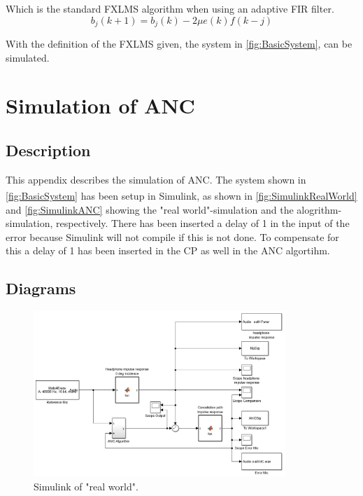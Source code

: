 Which is the standard FXLMS algorithm when using an adaptive FIR filter.
\begin{equation}\label{eq:FXLMSw_j(k+1)}
b_j(k+1) = b_j(k) - 2\mu e(k)f(k-j)
\end{equation}

With the definition of the FXLMS given, the system in \autoref{fig:BasicSystem}, can be simulated.
















\newpage
\section{Simulation of ANC} 
\subsection{Description}
This appendix describes the simulation of ANC. The system shown in \autoref{fig:BasicSystem} has been setup in Simulink\textsuperscript{\textregistered}, as shown in \autoref{fig:SimulinkRealWorld} and \autoref{fig:SimulinkANC} showing the "real world"-simulation and the alogrithm-simulation, respectively. There has been inserted a delay of 1 in the input of the error because Simulink will not compile if this is not done. To compensate for this a delay of 1 has been inserted in the CP as well in the ANC algortihm.   

\subsection{Diagrams}
\begin{figure}[H]
	\centering
	\includegraphics[width=0.85\textwidth]{figures/BasicSystem/SimulinkRealWorld}
	\caption{Simulink of "real world".}
	\label{fig:SimulinkRealWorld}
\end{figure}    

